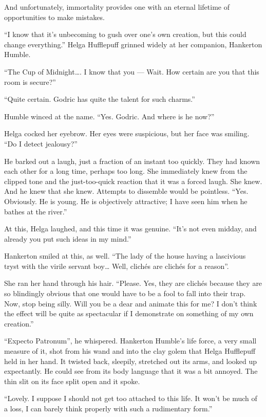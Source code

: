 And unfortunately, immortality provides one with an eternal lifetime of opportunities to make mistakes.

\simpleline


“I know that it’s unbecoming to gush over one’s own creation, but this could change everything.” Helga Hufflepuff grinned widely at her companion, Hankerton Humble.

“The Cup of Midnight…. I know that you — Wait. How certain are you that this room is secure?”

“Quite certain. Godric has quite the talent for such charms.”

Humble winced at the name. “Yes. Godric. And where is he now?”

Helga cocked her eyebrow. Her eyes were suspicious, but her face was smiling. “Do I detect jealousy?”

He barked out a laugh, just a fraction of an instant too quickly. They had known each other for a long time, perhaps too long. She immediately knew from the clipped tone and the just-too-quick reaction that it was a forced laugh. She knew. And he knew that she knew. Attempts to dissemble would be pointless. “Yes. Obviously. He is young. He is objectively attractive; I have seen him when he bathes at the river.”

At this, Helga laughed, and this time it was genuine. “It’s not even midday, and already you put such ideas in my mind.”

Hankerton smiled at this, as well. “The lady of the house having a lascivious tryst with the virile servant boy… Well, clichés are clichés for a reason”.

She ran her hand through his hair. “Please. Yes, they are clichés because they are so blindingly obvious that one would have to be a fool to fall into their trap. Now, stop being silly. Will you be a dear and animate this for me? I don’t think the effect will be quite as spectacular if I demonstrate on something of my own creation.”

“Expecto Patronum”, he whispered. Hankerton Humble’s life force, a very small measure of it, shot from his wand and into the clay golem that Helga Hufflepuff held in her hand. It twisted back, sleepily, stretched out its arms, and looked up expectantly. He could see from its body language that it was a bit annoyed. The thin slit on its face split open and it spoke.

“Lovely. I suppose I should not get too attached to this life. It won’t be much of a loss, I can barely think properly with such a rudimentary form.”

